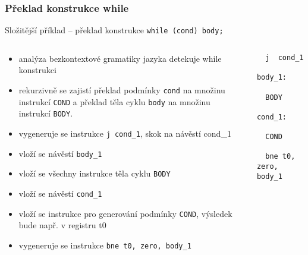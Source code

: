 \documentclass{beamer}
\begin{document}
\begin{frame}[fragile]
\frametitle{Překlad konstrukce while}

Složitější příklad -- překlad konstrukce \texttt{while (cond) body;}
\begin{columns}
\begin{column}{0.7\textwidth}
\small
\begin{itemize}
 \item analýza bezkontextové gramatiky jazyka detekuje while konstrukci
 \item rekurzivně se zajistí překlad podmínky \texttt{cond} na množinu instrukcí \texttt{COND} a překlad těla cyklu \texttt{body} na množinu instrukcí \texttt{BODY}.
 \item vygeneruje se instrukce \texttt{j cond\_1}, skok na návěstí cond\_1
 \item vloží se návěstí \texttt{body\_1}
 \item vloží se všechny instrukce těla cyklu \texttt{BODY}
 \item vloží se návěstí \texttt{cond\_1}
 \item vloží se instrukce pro generování podmínky \texttt{COND}, výsledek bude např. v registru t0
 \item vygeneruje se instrukce \texttt{bne t0, zero, body\_1}
\end{itemize}
\end{column}
\begin{column}{0.3\textwidth}  
\begin{verbatim}
  j  cond_1
    
body_1:

  BODY

cond_1:

  COND
    
  bne t0, zero, body_1
\end{verbatim}
\end{column}
\end{columns}

\end{frame}
\end{document}
